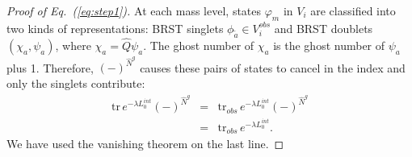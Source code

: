 \documentclass[a4paper,12pt]{article}
\newcommand{\tr}{\mbox{tr}\,}
\newcommand{\eq}[1]{(\ref{eq:#1})}
\newcommand{\hN}{\hat{N}^g}
\newcommand{\hQ}{\hat{Q}}
\newcommand{\ta}{\tilde{a}}
\begin{document}

\begin{proof}[Proof of Eq.~\eq{step1}]
At each mass level, states $\varphi_{m}$ in $V_{i}$ are classified
into two kinds of representations: BRST singlets $\phi_{\ta} \in V^{obs}_{i}$
and BRST
doublets $(\chi_{a}, \psi_{a})$, where $\chi_{a} = \hQ \psi_{a}$.
The ghost
number of $\chi_{a}$ is the ghost number of $\psi_{a}$ plus 1. Therefore,
$(-)^{\hN}$ causes these pairs of states to cancel in the index and only the singlets
contribute:
\begin{eqnarray}
%
\tr e^{-\lambda L_{0}^{int}} (-)^{\hN}
        &=& \mbox{tr}_{obs} \, e^{-\lambda L_{0}^{int}} (-)^{\hN} \\
        &=& \mbox{tr}_{obs} \, e^{-\lambda L_{0}^{int}}.
%
\end{eqnarray}
We have used the vanishing theorem on the last line.
\end{proof}
\end{document}
